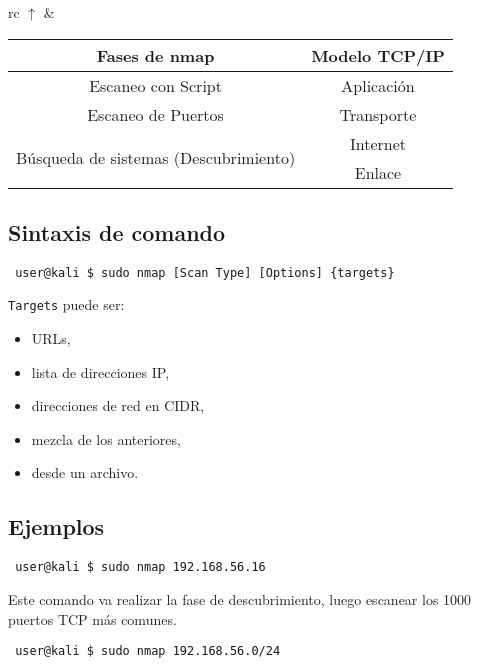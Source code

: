 \documentclass{article}
\begin{document}
\begin{center}
    \begin{tabular}{rc}
        \Huge$\uparrow$ & 
        \begin{tabular}{cc}
            \textbf{Fases de nmap} & \textbf{Modelo TCP/IP}\\ \hline
            Escaneo con Script & Aplicaci\'on \\ \hline
            Escaneo de Puertos & Transporte \\ \hline
            \multirow{2}{*}{B\'usqueda de sistemas (Descubrimiento)} & Internet\\ \cline{2-2}
            & Enlace \\ \hline
        \end{tabular}
    \end{tabular}
\end{center}

\subsection{Sintaxis de comando}

\begin{lstlisting}
 user@kali $ sudo nmap [Scan Type] [Options] {targets}
\end{lstlisting}

\texttt{Targets} puede ser:

\begin{itemize}
    \item URLs,
    \item lista de direcciones IP,
    \item direcciones de red en CIDR,
    \item mezcla de los anteriores,
    \item desde un archivo.
\end{itemize}

\subsection{Ejemplos}

\begin{lstlisting}
 user@kali $ sudo nmap 192.168.56.16
\end{lstlisting}

Este comando va realizar la fase de descubrimiento, luego escanear los 1000 puertos TCP m\'as comunes.\\

\begin{lstlisting}
 user@kali $ sudo nmap 192.168.56.0/24
\end{lstlisting}
\end{document}
